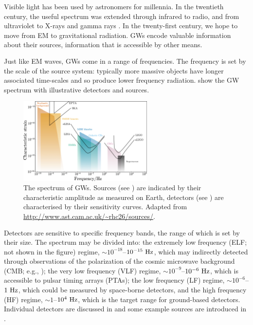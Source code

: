 Visible light has been used by astronomers for millennia. In the twentieth century, the useful spectrum was extended through infrared to radio, and from ultraviolet to X-rays and gamma rays \citep[chapter 7]{Longair2006}. In the twenty-first century, we hope to move from EM to gravitational radiation. GWs encode valuable information about their sources, information that is accessible by other means.

Just like EM waves, GWs come in a range of frequencies. The frequency is set by the scale of the source system: typically more massive objects have longer associated time-scales and so produce lower frequency radiation.  show the GW spectrum with illustrative detectors and sources.
\begin{figure}
  \begin{center}
  \includegraphics[width=0.6\textwidth]{./images/GW_spectrum}
    \caption{The spectrum of GWs. Sources (see ) are indicated by their characteristic amplitude as measured on Earth, detectors (see ) are characterised by their sensitivity curves. Adapted from \url{http://www.ast.cam.ac.uk/~rhc26/sources/}.}   
    \label{fig:spectrum} 
  \end{center}
\end{figure}
Detectors are sensitive to specific frequency bands, the range of which is set by their size. The spectrum may be divided into: the extremely low frequency (ELF; not shown in the figure) regime, $\sim10^{-18}$--$10^{-15}~\mathrm{Hz}$, which may indirectly detected through observations of the polarization of the cosmic microwave background (CMB; e.g., \citealt{Hu1997,Kamionkowski1997}); the very low frequency (VLF) regime, $\sim10^{-9}$--$10^{-6}~\mathrm{Hz}$, which is accessible to pulsar timing arrays (PTAs); the low frequency (LF) regime, $\sim10^{-6}$--$1~\mathrm{Hz}$, which could be measured by space-borne detectors, and the high frequency (HF) regime, $\sim1$--$10^4~\mathrm{Hz}$, which is the target range for ground-based detectors. Individual detectors are discussed in  and some example sources are introduced in .


